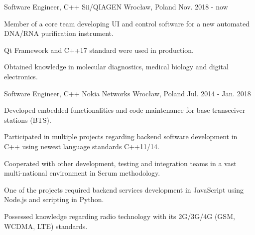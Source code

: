 


\begin{cventries}

  \cventry
    {Software Engineer, C++}
    {Sii/QIAGEN}
    {Wrocław, Poland}
    {Nov. 2018 - now}
    {
      \begin{cvitems}
        \item {Member of a core team developing UI and control software for a new automated DNA/RNA purification instrument.}
        \item {Qt Framework and C++17 standard were used in production.}
        \item {Obtained knowledge in molecular diagnostics, medical biology and digital electronics.}
      \end{cvitems}
    }

  \cventry
    {Software Engineer, C++}
    {Nokia Networks}
    {Wrocław, Poland}
    {Jul. 2014 - Jan. 2018}
    {
      \begin{cvitems}
        \item {Developed embedded functionalities and code maintenance for base transceiver stations (BTS).}
        \item {Participated in multiple projects regarding backend software development in C++ using newest language standards C++11/14.}
        \item {Cooperated with other development, testing and integration teams in a vast multi-national environment in Scrum methodology.}
        \item {One of the projects required backend services development in JavaScript using Node.js and scripting in Python.}
        \item {Possessed knowledge regarding radio technology with its 2G/3G/4G (GSM, WCDMA, LTE) standards.}
      \end{cvitems}
    }

\end{cventries}

